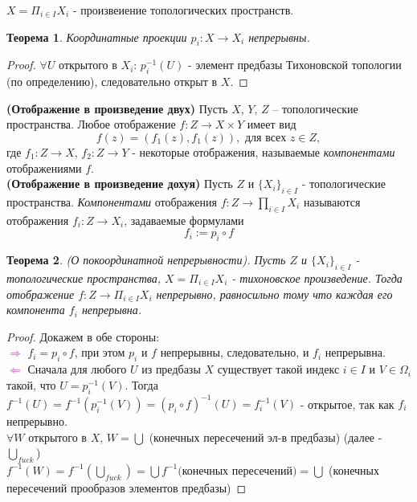 \documentclass[a4paper,100pt]{article}
\theoremstyle{indented}
\newtheorem{theorem}{Теорема}
\begin{document}
$X = \Pi_{i\in I}X_i$ - произвеиение топологических пространств.\\

\begin{theorem}
    Координатные проекции $p_i: X\rightarrow X_i$ непрерывны.
\end{theorem}

\begin{proof}
    $\forall U$ открытого в $X_i$: $p_i^{-1}(U)$ - элемент предбазы Тихоновской топологии (по определению), следовательно открыт в $X$.
\end{proof}

\textbf{(Отображение в произведение двух)} Пусть $X$, $Y$, $Z$ – топологические пространства. Любое отображение $f: Z \to X \times Y$ имеет вид
    \[
        f(z) = (f_1(z), f_1(z)), \text{ для всех $z \in Z$},
    \]
где $f_1: Z \to X$, $f_2: Z \to Y$ - некоторые отображения, называемые \textit{компонентами} отображениями $f$. \\ 

\textbf{(Отображение в произведение дохуя)} Пусть $Z$ и $\{X_i\}_{i \in I}$ -  топологические пространства. \textit{Компонентами} отображения $f: Z \to \prod_{i \in I} X_i$ называются отображения $f_i: Z \to X_i$, задаваемые формулами
     \[
        f_i := p_i \circ f
    \]

\begin{theorem}
    (О покоординатной непрерывности). Пусть $Z$ и $\{X_i\}_{i\in I}$ - топологические пространства, $X = \Pi_{i\in I}X_i$ - тихоновское произведение. Тогда отображение $f: Z\rightarrow \Pi_{i\in I}X_i$ непрерывно, равносильно тому что каждая его компонента $f_i$ непрерывна.
\end{theorem}

\begin{proof} Докажем в обе стороны:\\

    \textcolor{magenta}{$\Rightarrow$} $f_i = p_i \circ f$, при этом $p_i$ и $f$ непрерывны, следовательно, и $f_i$ непрерывна.\\

    \textcolor{magenta}{$\Leftarrow$} Сначала для любого $U$ из предбазы $X$ существует такой индекс $i\in I$ и $V\in \Omega_i$ такой, что $U=p_i^{-1}(V)$. Тогда $f^{-1}(U)=f^{-1}(p_i^{-1}(V))=(p_i\circ f)^{-1}(U)= f_i^{-1}(V) $ - открытое, так как $f_i$ непрерывно. \\

    $\forall W$ открытого в $X$, $W = \bigcup $ (конечных пересечений эл-в предбазы) (далее - $\bigcup_{fuck}$)\\

    $f^{-1}(W)=f^{-1}(\bigcup_{fuck}) = \bigcup f^{-1}($конечных пересечений$)=\bigcup $ (конечных пересечений прообразов элементов предбазы)

\end{proof}
\end{document}
